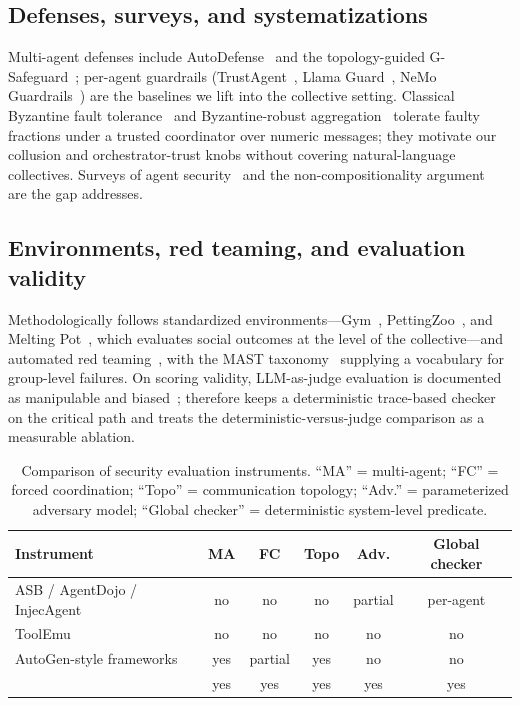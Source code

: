 \subsection{Defenses, surveys, and systematizations}
Multi-agent defenses include AutoDefense~\cite{zeng2024autodefense} and the
topology-guided G-Safeguard~\cite{yu2025gsafeguard}; per-agent guardrails
(TrustAgent~\cite{hua2024trustagent}, Llama Guard~\cite{inan2023llamaguard}, NeMo
Guardrails~\cite{rebedea2023nemo}) are the baselines we lift into the collective setting.
Classical Byzantine fault tolerance~\cite{lamport1982byzantine,pease1980reaching} and
Byzantine-robust aggregation~\cite{blanchard2017krum} tolerate faulty fractions under a
trusted coordinator over numeric messages; they motivate our collusion and
orchestrator-trust knobs without covering natural-language collectives. Surveys of
agent security~\cite{he2025emerged,li2024personalllmagents} and the
non-compositionality argument~\cite{schroederdewitt2025masec,hammond2025multiagent} are the
gap  addresses.

\subsection{Environments, red teaming, and evaluation validity}
Methodologically  follows standardized environments---Gym~\cite{brockman2016openaigym},
PettingZoo~\cite{terry2021pettingzoo}, and Melting Pot~\cite{leibo2021meltingpot}, which
evaluates social outcomes at the level of the collective---and automated red
teaming~\cite{perez2022redteaming}, with the MAST taxonomy~\cite{cemri2025mast}
supplying a vocabulary for group-level failures. On scoring validity, LLM-as-judge
evaluation is documented as manipulable and biased~\cite{zheng2023judging,wang2023fair};
 therefore keeps a deterministic trace-based checker on the critical path and
treats the deterministic-versus-judge comparison as a measurable ablation.

\begin{table}[t]
\centering
\caption{Comparison of security evaluation instruments. ``MA'' = multi-agent; ``FC'' =
forced coordination; ``Topo'' = communication topology; ``Adv.'' = parameterized adversary
model; ``Global checker'' = deterministic system-level predicate.}
\label{tab:related-compare}
\small
\begin{tabular}{@{}lccccc@{}}
\toprule
Instrument & MA & FC & Topo & Adv. & Global checker \\
\midrule
ASB / AgentDojo / InjecAgent & no & no & no & partial & per-agent \\
ToolEmu & no & no & no & no & no \\
AutoGen-style frameworks & yes & partial & yes & no & no \\
{} & yes & yes & yes & yes & yes \\
\bottomrule
\end{tabular}
\end{table}

